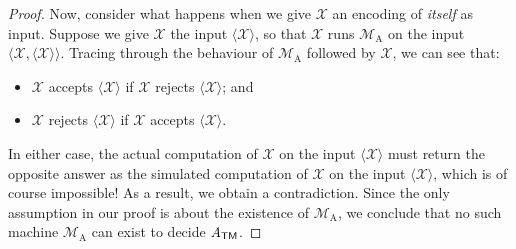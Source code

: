 \begin{theorem}
\begin{proof}
Now, consider what happens when we give $\mathcal{X}$ an encoding of \emph{itself} as input. Suppose we give $\mathcal{X}$ the input $\langle \mathcal{X} \rangle$, so that $\mathcal{X}$ runs $\mathcal{M}_{\mathrm{A}}$ on the input $\langle \mathcal{X}, \langle \mathcal{X} \rangle \rangle$. Tracing through the behaviour of $\mathcal{M}_{\mathrm{A}}$ followed by $\mathcal{X}$, we can see that:
\begin{itemize}
\item $\mathcal{X}$ accepts $\langle \mathcal{X} \rangle$ if $\mathcal{X}$ rejects $\langle \mathcal{X} \rangle$; and
\item $\mathcal{X}$ rejects $\langle \mathcal{X} \rangle$ if $\mathcal{X}$ accepts $\langle \mathcal{X} \rangle$.
\end{itemize}
In either case, the actual computation of $\mathcal{X}$ on the input $\langle \mathcal{X} \rangle$ must return the opposite answer as the simulated computation of $\mathcal{X}$ on the input $\langle \mathcal{X} \rangle$, which is of course impossible! As a result, we obtain a contradiction. Since the only assumption in our proof is about the existence of $\mathcal{M}_{\mathrm{A}}$, we conclude that no such machine $\mathcal{M}_{\mathrm{A}}$ can exist to decide $\mathit{A}_{\textsf{TM}}$.
\end{proof}
\end{theorem}


